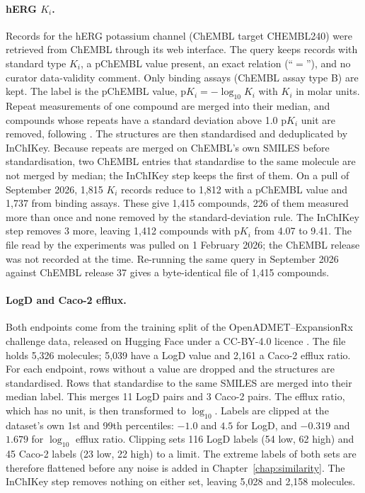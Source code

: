 \paragraph{\texorpdfstring{hERG $K_i$.}{hERG Ki.}} Records for the hERG potassium channel (ChEMBL target CHEMBL240) were retrieved from ChEMBL \citep{Zdrazil2023} through its web interface. The query keeps records with standard type $K_i$, a pChEMBL value present, an exact relation (``$=$''), and no curator data-validity comment. Only binding assays (ChEMBL assay type B) are kept. The label is the pChEMBL value, $\mathrm{p}K_i = -\log_{10} K_i$ with $K_i$ in molar units. Repeat measurements of one compound are merged into their median, and compounds whose repeats have a standard deviation above 1.0 p$K_i$ unit are removed, following \citet{landrum2024}. The structures are then standardised and deduplicated by InChIKey. Because repeats are merged on ChEMBL's own SMILES before standardisation, two ChEMBL entries that standardise to the same molecule are not merged by median; the InChIKey step keeps the first of them. On a pull of September 2026, 1,815 $K_i$ records reduce to 1,812 with a pChEMBL value and 1,737 from binding assays. These give 1,415 compounds, 226 of them measured more than once and none removed by the standard-deviation rule. The InChIKey step removes 3 more, leaving 1,412 compounds with p$K_i$ from 4.07 to 9.41. The file read by the experiments was pulled on 1 February 2026; the ChEMBL release was not recorded at the time. Re-running the same query in September 2026 against ChEMBL release 37 gives a byte-identical file of 1,415 compounds.

\paragraph{LogD and Caco-2 efflux.} Both endpoints come from the training split of the OpenADMET--ExpansionRx challenge data, released on Hugging Face under a CC-BY-4.0 licence \citep{openadmet}. The file holds 5,326 molecules; 5,039 have a LogD value and 2,161 a Caco-2 efflux ratio. For each endpoint, rows without a value are dropped and the structures are standardised. Rows that standardise to the same SMILES are merged into their median label. This merges 11 LogD pairs and 3 Caco-2 pairs. The efflux ratio, which has no unit, is then transformed to $\log_{10}$. Labels are clipped at the dataset's own 1st and 99th percentiles: $-1.0$ and $4.5$ for LogD, and $-0.319$ and $1.679$ for $\log_{10}$ efflux ratio. Clipping sets 116 LogD labels (54 low, 62 high) and 45 Caco-2 labels (23 low, 22 high) to a limit. The extreme labels of both sets are therefore flattened before any noise is added in Chapter~\ref{chap:similarity}. The InChIKey step removes nothing on either set, leaving 5,028 and 2,158 molecules.

